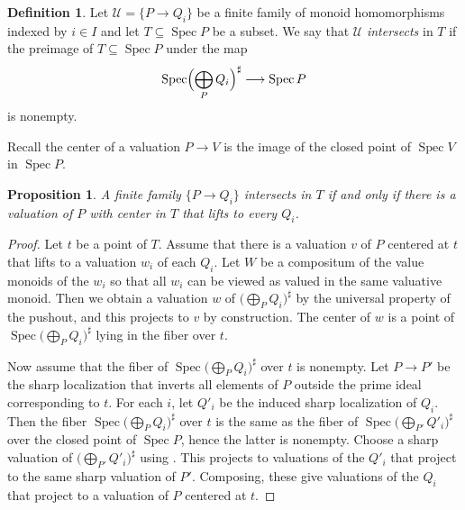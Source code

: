 \documentclass[10pt]{article}
\numberwithin{equation}{section}
\newtheorem{proposition}[paragraph]{Proposition}
\theoremstyle{definition}
\newtheorem{definition}[paragraph]{Definition}
\theoremstyle{remark}
\def\Spec{\operatorname{Spec}}
\def\spec{\Spec}
\begin{document}
\begin{definition} \label{def:2}
	Let $\mathcal U = \{P \to Q_i\}$ be a finite family of monoid homomorphisms indexed by $i \in I$ and let $T \subseteq \spec P$ be a subset.  We say that $\mathcal U$ \emph{intersects} in $T$ if the preimage of $T \subseteq \spec P$ under the map 
	\[
	\spec \Bigl(\bigoplus_P Q_i\Bigr)^\sharp \longrightarrow \spec P
	\]
	is nonempty. 
\end{definition}







Recall the center of a valuation $P \to V$ is the image of the closed point of $\spec V$ in $\spec P$. 

\begin{proposition}  \label{prop:18}
	A finite family $\{P \to Q_i\}$ intersects in $T$ if and only if there is a valuation of $P$ with center in $T$ that lifts to every $Q_i$.
\end{proposition}







\begin{proof}
	Let $t$ be a point of $T$.  Assume that there is a valuation $v$ of $P$ centered at $t$ that lifts to a valuation $w_i$ of each $Q_i$.  Let $W$ be a compositum \cite[Corollary~2.2]{Pierce1972Amalgamations} of the value monoids of the $w_i$ so that all $w_i$ can be viewed as valued in the same valuative monoid.  Then we obtain a valuation $w$ of $\bigl( \bigoplus_P Q_i \bigr)^\sharp$ by the universal property of the pushout, and this projects to $v$ by construction.  The center of $w$ is a point of $\spec \bigl( \bigoplus_P Q_i \bigr)^\sharp$ lying in the fiber over $t$.





	Now assume that the fiber of $\spec \bigl( \bigoplus_P Q_i \bigr)^\sharp$ over $t$ is nonempty.  Let $P \to P'$ be the sharp localization that inverts all elements of $P$ outside the prime ideal corresponding to $t$.  For each $i$, let $Q'_i$ be the induced sharp localization of $Q_i$.  Then the fiber $\spec \bigl( \bigoplus_P Q_i \bigr)^\sharp$ over $t$ is the same as the fiber of $\spec \bigl( \bigoplus_{P'} Q'_i \bigr)^\sharp$ over the closed point of $\spec P$, hence the latter is nonempty.  Choose a sharp valuation of $\bigl( \bigoplus_{P'} Q'_i \bigr)^\sharp$ using \cite[Proposition~I.2.4.1]{ogusloggeom}.  This projects to valuations of the $Q'_i$ that project to the same sharp valuation of $P'$.  Composing, these give valuations of the $Q_i$ that project to a valuation of $P$ centered at $t$.
\end{proof}
\end{document}
